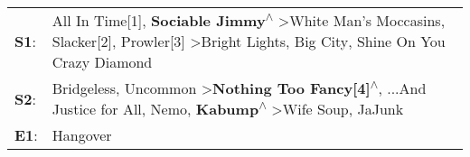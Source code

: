 \begin{supertabular}{p{0.03\textwidth}p{0.92\textwidth}}
 \textbf{S1}:  &               All In Time[1]\textsuperscript{}, \enspace \textbf{Sociable Jimmy\textsuperscript{$\wedge$}} \textgreater \enspace White Man's Moccasins\textsuperscript{}, \enspace Slacker[2]\textsuperscript{}, \enspace Prowler[3]\textsuperscript{} \textgreater \enspace Bright Lights, Big City\textsuperscript{}, \enspace Shine On You Crazy Diamond\textsuperscript{}  \enspace  \\
 \textbf{S2}:  &  Bridgeless\textsuperscript{}, \enspace Uncommon\textsuperscript{} \textgreater \enspace \textbf{Nothing Too Fancy[4]\textsuperscript{$\wedge$}}, \enspace ...And Justice for All\textsuperscript{}, \enspace Nemo\textsuperscript{}, \enspace \textbf{Kabump\textsuperscript{$\wedge$}} \textgreater \enspace Wife Soup\textsuperscript{}, \enspace JaJunk\textsuperscript{}  \enspace  \\
 \textbf{E1}:  &                                                                                                                                                                                                                                                                                                                                                    Hangover\textsuperscript{}  \enspace  \\
\end{supertabular}
